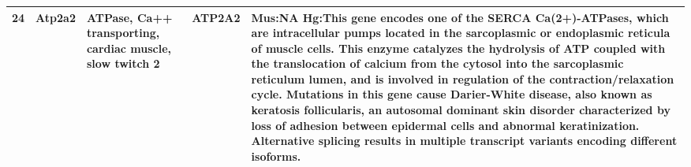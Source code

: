 \documentclass[11pt, landscape]{article}   	%
\begin{document}
\begin{table}[ht]
\begin{tabular}{rlp{3cm}lp{12cm}}
  24 & Atp2a2 & ATPase, Ca++ transporting, cardiac muscle, slow twitch 2 & ATP2A2 & Mus:NA Hg:This gene encodes one of the SERCA Ca(2+)-ATPases, which are intracellular pumps located in the sarcoplasmic or endoplasmic reticula of muscle cells. This enzyme catalyzes the hydrolysis of ATP coupled with the translocation of calcium from the cytosol into the sarcoplasmic reticulum lumen, and is involved in regulation of the contraction/relaxation cycle. Mutations in this gene cause Darier-White disease, also known as keratosis follicularis, an autosomal dominant skin disorder characterized by loss of adhesion between epidermal cells and abnormal keratinization. Alternative splicing results in multiple transcript variants encoding different isoforms. \\ 
 
   \hline
\end{tabular}
\end{table}
\end{document}
